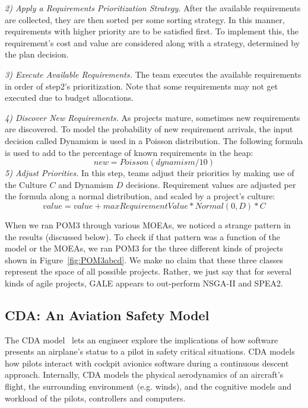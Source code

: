 \documentclass[10pt,journal,compsoc]{IEEEtran}
\newcommand{\fig}[1]{Figure~\ref{fig:#1}}
\begin{document}
    {\em 2) Apply a Requirements Prioritization Strategy.}  After the
    available requirements are collected, they are then sorted per some
    sorting strategy. In this manner, requirements with higher priority
    are to be satisfied first. To implement this, the requirement's cost
    and value are considered along with a strategy, determined by the
    plan decision.
    
    {\em 3) Execute Available Requirements.} The team executes the
    available requirements in order of step2's prioritization.
    Note that some requirements may not get executed due to budget allocations.
    
    {\em 4) Discover New Requirements.} As projects mature, sometimes new requirements are discovered.  To model the probability of new requirement arrivals, the input decision called Dynamism is used in a Poisson distribution.  
    The following formula  is used to add to the percentage of known requirements in the heap:
    \begin{equation}\label{eq:dymn}
    \textit{new} = \textit{Poisson}\left(\textit{dynamism}/10\right)
    \end{equation}
    {\em 5) Adjust Priorities.} In this step, teams adjust their priorities by making use of the Culture $C$ and Dynamism 
    $D$ decisions.  Requirement values are adjusted per the formula along a normal distribution, and scaled by a project’s culture:
    \[
    \textit{value} = \textit{value} + \textit{maxRequirementValue}*\textit{Normal}(0, D)*C
    \]  

When we ran POM3 through various MOEAs, we noticed a strange pattern in the results
(discussed below). To check if that pattern was a function of the model or the MOEAs,
we ran POM3 for the three different kinds of projects shown in \fig{POM3abcd}.
We make no claim that these three classes represent the space of all possible projects.
Rather, we just say that for several kinds of agile projects,
GALE appears to out-perform NSGA-II and SPEA2.



\subsection{CDA: An Aviation Safety Model}\label{sec:cda}

The CDA model~\cite{Kim2011,Pritchett2011,Feigh2012,Kim2013,Pritchett2013,krall15:hms} lets an engineer explore the implications of how software presents an airplane's status to a pilot in safety critical situations. 
CDA models how pilots interact with cockpit avionics software during a continuous descent approach.
Internally, CDA models the physical aerodynamics of an aircraft's flight, the surrounding environment (e.g. winds), and the cognitive models and workload of the pilots, controllers and computers.
\end{document}
